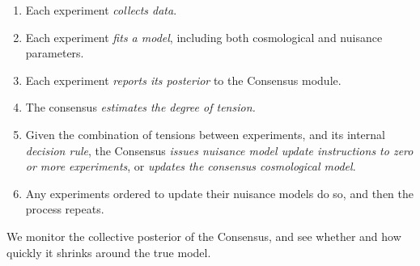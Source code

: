 \documentclass{article}
\begin{document}
\begin{enumerate}
\item Each experiment {\it collects data}.
\item Each experiment {\it fits a model}, including both cosmological and nuisance parameters.
\item Each experiment {\it reports its posterior } to the Consensus module.
\item The consensus {\it estimates the degree of tension.}
\item Given the combination of tensions between experiments, and its internal {\it decision rule}, the Consensus {\it issues nuisance model update instructions to zero or more experiments}, or {\it updates the consensus cosmological model}.
\item Any experiments ordered to update their nuisance models do so, and then the process repeats.
\end{enumerate}

We monitor the collective posterior of the Consensus, and see whether and how quickly it shrinks around the true model.
\end{document}
